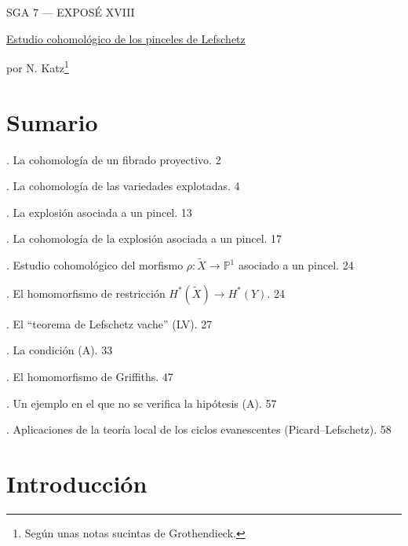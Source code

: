\pageoriginale

\clearpage
{}
\begin{center}
{\large SGA 7 --- EXPOSÉ XVIII}\par
\vspace{2em}
{\Large\underline{Estudio cohomológico de los pinceles de Lefschetz}}\par
\vspace{1.5em}
{\large por N. Katz\footnote{Según unas notas sucintas de Grothendieck.}}
\end{center}

\section*{Sumario}

. La cohomología de un fibrado proyectivo. \hfill 2

. La cohomología de las variedades explotadas. \hfill 4

. La explosión asociada a un pincel. \hfill 13

. La cohomología de la explosión asociada a un pincel. \hfill 17

. Estudio cohomológico del morfismo
$\rho:\widetilde X\longrightarrow\mathbb P^1$ asociado a un pincel.
\hfill 24

\noindent{}. El homomorfismo de restricción
$H^*(\widetilde X)\longrightarrow H^*(Y)$. \hfill 24

\noindent{}. El ``teorema de Lefschetz vache'' (LV). \hfill 27

\noindent{}. La condición (A). \hfill 33

\noindent{}. El homomorfismo de Griffiths. \hfill 47

\noindent{}. Un ejemplo en el que no se verifica la hipótesis (A).
\hfill 57

. Aplicaciones de la teoría local de los ciclos evanescentes
(Picard--Lefschetz). \hfill 58

\pageoriginale

\section*{Introducción}

